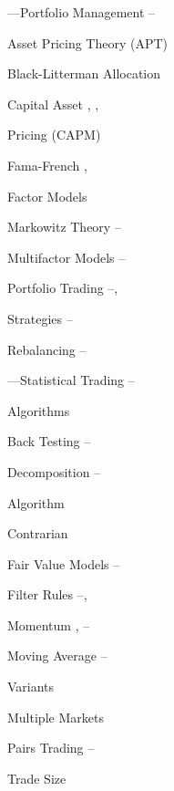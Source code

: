 \begin{multicols}{2}
\noindent ---Portfolio Management \hfill \pageref{in:portman1}--\pageref{in:portman2} \par
\twoindent Asset Pricing Theory (APT) \hfill \pageref{in:apt} \par
\twoindent Black-Litterman Allocation \hfill \pageref{in:allo} \par 
\twoindent Capital Asset \hfill \pageref{in:capm1}, \pageref{in:capm2}, \pageref{in:capm3} \par
\hspace{0.75cm} Pricing (CAPM) \par 
\twoindent Fama-French \hfill \pageref{in:fama1}, \pageref{in:fama2} \par \hspace{0.75cm} Factor Models \par 
\twoindent Markowitz Theory \hfill \pageref{in:mark1}--\pageref{in:mark2} \par
\twoindent Multifactor Models \hfill \pageref{in:mfm1}--\pageref{in:mfm2} \par
\twoindent Portfolio Trading \hfill \pageref{in:ports1}--\pageref{in:ports2}, \par \hspace{0.75cm} Strategies \hfill \pageref{in:ports3}--\pageref{in:ports4} \par
\twoindent Rebalancing \hfill \pageref{in:rebalance1}--\pageref{in:rebalance2} \par
\vspace{\baselineskip}


\noindent ---Statistical Trading \hfill \pageref{in:sta1}--\pageref{in:sta2} \par \hspace{0.75cm} Algorithms \par
\twoindent Back Testing \hfill \pageref{in:back1}--\pageref{in:back2} \par
\twoindent Decomposition \hfill \pageref{in:decomp1}--\pageref{in:decomp2} \par \hspace{0.75cm} Algorithm \par 
\twoindent Contrarian \hfill \pageref{in:contrary} \par
\twoindent Fair Value Models \hfill \pageref{in:fvm1}--\pageref{in:fvm2} \par
\twoindent Filter Rules \hfill \pageref{in:filter1}--\pageref{in:filter2}, \pageref{in:filter3} \par
\twoindent Momentum \hfill \pageref{in:mom1}, \pageref{in:mom2}--\pageref{in:mom3} \par
\twoindent Moving Average \hfill \pageref{in:mva1}--\pageref{in:mva2} \par \hspace{0.75cm} Variants \par 
\twoindent Multiple Markets \hfill \pageref{in:multmark} \par
\twoindent Pairs Trading \hfill \pageref{in:pairs1}--\pageref{in:pairs2} \par
\twoindent Trade Size \hfill \pageref{in:tradesize} \par
\vspace{\baselineskip}



\end{multicols}
